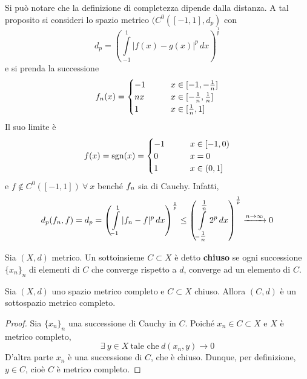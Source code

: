 \begin{oss}
    Si può notare che la definizione di completezza dipende dalla distanza. A tal proposito si consideri lo spazio metrico $(C^0([-1,1], d_p)$ con 
    \begin{equation*}
        d_p=\left(\int\limits_{-1}^{1}{|f(x)-g(x)|^p\, dx}\right)^\frac{1}{p}
    \end{equation*}
    e si prenda la successione
    \begin{equation*}
        f_n(x) = \begin{cases}
            -1 &\qquad x \in [-1, -\frac{1}{n}]\\
            nx &\qquad x \in [-\frac{1}{n}, \frac{1}{n}]\\
            1 &\qquad x \in [\frac{1}{n}, 1]
        \end{cases}
    \end{equation*}
    Il suo limite è
    \begin{equation*}
        f(x)= \operatorname{sgn}(x)=\begin{cases}
            -1 &\qquad x \in [-1,0)\\
            0 &\qquad x =0\\
            1 &\qquad x \in (0, 1]
        \end{cases}
    \end{equation*}
    e $f\notin C^0([-1, 1])\ \forall\ x$
    benché $f_n$ sia di Cauchy. Infatti, 
    \begin{equation*}
        d_p(f_n, f)=  d_p=\left(\int\limits_{-1}^{1}{|f_n-f|^p\, dx}\right)^\frac{1}{p} \leq \left(\int\limits_{-\tfrac{1}{n}}^{\tfrac{1}{n}}{2^p\, dx}\right)^\frac{1}{p} \xrightarrow{n \to \infty}0
    \end{equation*}
\end{oss}
\begin{definition} \label{Def: Spazio chiuso}
    Sia $(X, d)$ metrico. Un sottoinsieme $C \subset X$ è detto \textbf{chiuso} se ogni successione $\{x_n\}_n$ di elementi di $C$ che converge rispetto a $d$, converge ad un elemento di $C$.
\end{definition}
\begin{theorem} \label{Teo: Sottospazio chiuso di un completo è completo}
    Sia $(X,d)$ uno spazio metrico completo e $C \subset X$ chiuso. Allora $(C, d)$ è un sottospazio metrico completo.
\end{theorem}
\begin{proof}
    Sia $\{x_n\}_n$ una successione di Cauchy in $C$. Poiché $x_n \in C \subset X$ e $X$ è metrico completo, 
    \begin{equation*}
        \exists\ y \in X\ \text{tale che}\ d(x_n, y)\to 0
    \end{equation*}
    D'altra parte $x_n$ è una successione di $C$, che è chiuso. Dunque, per definizione, $y \in C$, cioè $C$ è metrico completo.
\end{proof}
